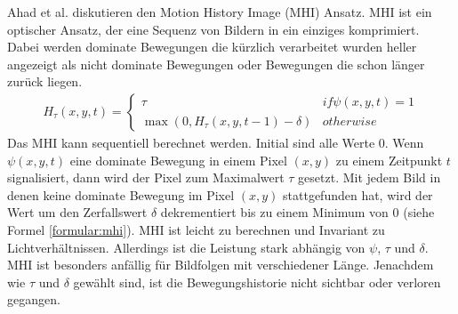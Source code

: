 \newline
\newline
Ahad et al. \cite{ahad2012motion} diskutieren den Motion History Image (MHI) Ansatz. MHI ist ein optischer Ansatz, der eine Sequenz von Bildern in ein einziges komprimiert. Dabei werden dominate Bewegungen die
kürzlich verarbeitet wurden heller angezeigt als nicht dominate Bewegungen oder Bewegungen die schon länger zurück liegen.
\begin{align}
    H_{\tau}(x,y,t) = \begin{cases}
                          \tau & if \psi(x,y,t) = 1 \\
                          \max(0, H_{\tau}(x,y,t-1) - \delta) & otherwise
    \end{cases}
    \label{formular:mhi}
\end{align}
Das MHI kann sequentiell berechnet werden. Initial sind alle Werte 0. Wenn $\psi(x,y,t)$ eine dominate Bewegung in einem Pixel $(x,y)$ zu einem Zeitpunkt $t$ signalisiert, dann wird der Pixel zum Maximalwert $\tau$
gesetzt. Mit jedem Bild in denen keine dominate Bewegung im Pixel $(x,y)$ stattgefunden hat, wird der Wert um den Zerfallswert $\delta$ dekrementiert bis zu einem Minimum von 0 (siehe Formel \ref{formular:mhi}).
\newline
\newline
MHI ist leicht zu berechnen und Invariant zu Lichtverhältnissen. Allerdings ist die Leistung stark abhängig von $\psi$, $\tau$ und $\delta$. MHI ist besonders anfällig für Bildfolgen mit verschiedener Länge.
Jenachdem wie $\tau$ und $\delta$ gewählt sind, ist die Bewegungshistorie nicht sichtbar oder verloren gegangen.